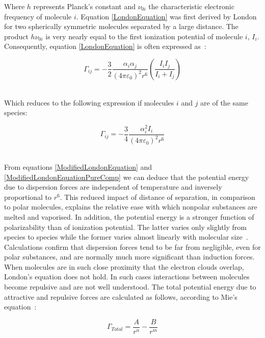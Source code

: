 Where $h$ represents Planck's constant and $\nu_{0i}$ the characteristic electronic frequency of molecule $i$. Equation \ref{LondonEquation} was first derived by London for two spherically symmetric molecules separated by a large distance. The product $h\nu_{0i}$ is very nearly equal to the first ionization potential of molecule $i$, $I_{i}$. Consequently, equation \ref{LondonEquation} is often expressed as~\cite{MolecularThermodynamicsOfFluidPhaseEquilibria}:\

\begin{equation}
\Gamma_{ij} = -\frac{3}{2}\frac{\alpha_{i}\alpha_{j}}{\left(4\pi\varepsilon_{0}\right)^{2}r^{6}}\left(\frac{I_{i}I_{j}}{I_{i}+I_{j}}\right) \label{ModifiedLondonEquation}
\end{equation}\

Which reduces to the following expression if molecules $i$ and $j$ are of the same species:\

\begin{equation}
\Gamma_{ij} = -\frac{3}{4}\frac{\alpha_{i}^{2}I_{i}}{\left(4\pi\varepsilon_{0}\right)^{2}r^{6}} \label{ModifiedLondonEquationPureComp}
\end{equation}\

From equations \ref{ModifiedLondonEquation} and \ref{ModifiedLondonEquationPureComp} we can deduce that the potential energy due to dispersion forces are independent of temperature and inversely proportional to $r^{6}$. This reduced impact of distance of separation, in comparison to polar molecules, explains the relative ease with which nonpolar substances are melted and vaporised. In addition, the potential energy is a stronger function of polarizability than of ionization potential. The latter varies only slightly from species to species while the former varies almost linearly with molecular size~\cite{MolecularThermodynamicsOfFluidPhaseEquilibria}.\\

Calculations confirm that dispersion forces tend to be far from negligible, even for polar substances, and are normally much more significant than induction forces. When molecules are in such close proximity that the electron clouds overlap, London's equation does not hold. In such cases interactions between molecules become repulsive and are not well understood. The total potential energy due to attractive and repulsive forces are calculated as follows, according to Mie's equation~\cite{MolecularThermodynamicsOfFluidPhaseEquilibria}:\

\begin{equation}
\Gamma_{Total} = \frac{A}{r^{n}}-\frac{B}{r^{m}} \label{MiePotentialShort}
\end{equation}\

